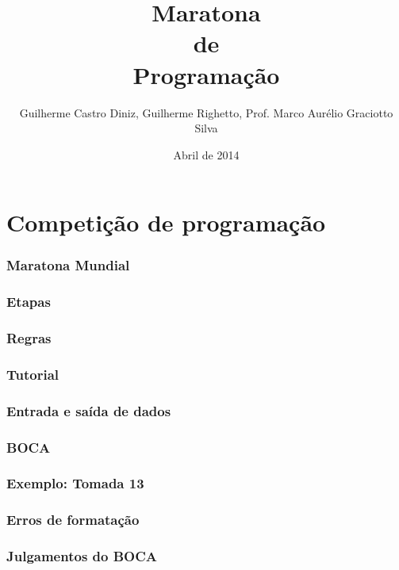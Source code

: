 \documentclass[utf8, usepdftitle=false, svgnames, color={table,
fixpdftex, hyperref, fixinclude, xcdraw}, t, brazil]{beamer}
\title{Maratona\\de\\Programação}
\author[UTFPR-CM]{Guilherme Castro Diniz, Guilherme Righetto, Prof. Marco Aurélio Graciotto Silva}
\date[]{Abril de 2014}
\begin{document}
 \frontmatter{}
 

 \part{Competição de programação}
 
 \section{Maratona Mundial}
 
 
 \section{Etapas}
 
 
 \section{Regras}
 
 
 \section{Tutorial}
 

 \section{Entrada e saída de dados}
 
 
 \section{BOCA}
 
 
 \section{Exemplo: Tomada 13}
 
 
 \section{Erros de formatação}
 
 
 \section{Julgamentos do BOCA}
 
 
\end{document}
